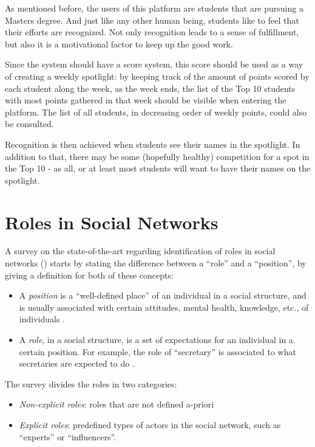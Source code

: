As mentioned before, the users of this platform are students that are pursuing a Masters degree. And just like any other human being, students like to feel that their efforts are recognized. Not only recognition leads to a sense of fulfillment, but also it is a motivational factor to keep up the good work. 

Since the system should have a score system, this score should be used as a way of creating a weekly spotlight: by keeping track of the amount of points scored by each student along the week, as the week ends, the list of the Top 10 students with most points gathered in that week should be visible when entering the platform. The list of all students, in decreasing order of weekly points, could also be consulted.

Recognition is then achieved when students see their names in the spotlight. In addition to that, there may be some (hopefully healthy) competition for a spot in the Top 10 - as all, or at least most students will want to have their names on the spotlight.

\section{Roles in Social Networks}
A survey on the state-of-the-art regarding identification of roles in social networks (\cite{forestier2012roles}) starts by stating the difference between a ``role'' and a ``position'', by giving a definition for both of these concepts:
\begin{itemize}
\item A \textit{position} is a ``well-defined place'' of an individual in a social structure, and is usually associated with certain attitudes, mental health, knowledge, etc., of individuals \cite{forestier2012roles,borgatti1992notions}.
\item A \textit{role}, in a social structure, is a set of expectations for an individual in a certain position. For example, the role of ``secretary'' is associated to what secretaries are expected to do \cite{forestier2012roles,nadel1957theory}.
\end{itemize}
The survey divides the roles in two categories:
\begin{itemize}
\item \textit{Non-explicit roles}: roles that are not defined a-priori
\item \textit{Explicit roles}: predefined types of actors in the social network, such as ``experts'' or ``influencers''.
\end{itemize}

